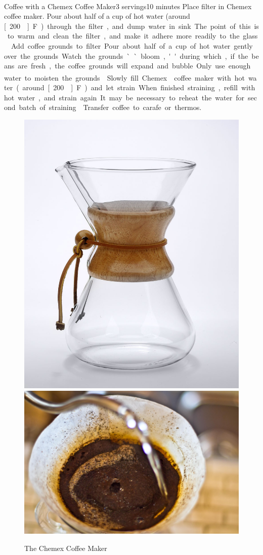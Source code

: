 \begin{recipe}{Coffee with a Chemex\textsuperscript{\texttrademark} Coffee Maker}{3 servings}{10 minutes}
Place filter in Chemex\textsuperscript{\texttrademark} coffee maker.  Pour about half of a cup of hot water (around \unit[200\0]{F}) through the filter, and dump water in sink.  The point of this is to warm and clean the filter, and make it adhere more readily to the glass.
Add coffee grounds to filter.  Pour about half of a cup of hot water gently over the grounds.  Watch the grounds ``bloom,'' during which, if the beans are fresh, the coffee grounds will expand and bubble.  Only use enough water to moisten the grounds.
\newstep
Slowly fill Chemex\textsuperscript{\texttrademark} coffee maker with hot water (around \unit[200\0]{F}) and let strain.  When finished straining, refill with hot water, and strain again.  It may be necessary to reheat the water for second batch of straining.
\newstep
Transfer coffee to carafe or thermos.
\end{recipe}
\begin{figure}[b!]
\begin{center}
\includegraphics[height=0.32\textwidth]{./figures/chemex}
\hspace{0.1\textwidth}
\includegraphics[height=0.25\textwidth]{./figures/chemex-2}
\end{center}
\caption*{The Chemex\tm{} Coffee Maker}
\end{figure}
\clearpage
